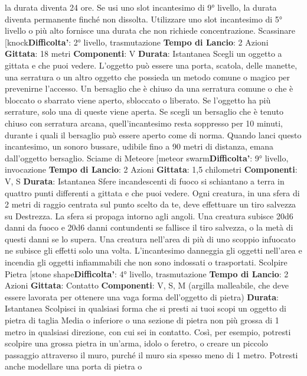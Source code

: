 \begin{multicols}{2}
la durata diventa 24 ore. Se usi uno slot incantesimo di
9° livello, la durata diventa permanente finché non
dissolta. Utilizzare uno slot incantesimo di 5° livello o
più alto fornisce una durata che non richiede
concentrazione.
Scassinare
[knock\textbf{Difficolta'}:
2° livello, trasmutazione
\textbf{Tempo di Lancio}: 2 Azioni
\textbf{Gittata}: 18 metri
\textbf{Componenti}: V
\textbf{Durata}: Istantanea
Scegli un oggetto a gittata e che puoi vedere. L’oggetto
può essere una porta, scatola, delle manette, una
serratura o un altro oggetto che possieda un metodo
comune o magico per prevenirne l’accesso.
Un bersaglio che è chiuso da una serratura comune o
che è bloccato o sbarrato viene aperto, sbloccato o
liberato. Se l’oggetto ha più serrature, solo una di
queste viene aperta.
Se scegli un bersaglio che è tenuto chiuso con
serratura arcana, quell’incantesimo resta soppresso per
10 minuti, durante i quali il bersaglio può essere aperto
come di norma.
Quando lanci questo incantesimo, un sonoro bussare,
udibile fino a 90 metri di distanza, emana dall’oggetto
bersaglio.
Sciame di Meteore
[meteor swarm\textbf{Difficolta'}:
9° livello, invocazione
\textbf{Tempo di Lancio}: 2 Azioni
\textbf{Gittata}: 1,5 chilometri
\textbf{Componenti}: V, S
\textbf{Durata}: Istantanea
Sfere incandescenti di fuoco si schiantano a terra in
quattro punti differenti a gittata e che puoi vedere. Ogni
creatura, in una sfera di 2 metri di raggio centrata sul
punto scelto da te, deve effettuare un tiro salvezza su
Destrezza. La sfera si propaga intorno agli angoli. Una
creatura subisce 20d6 danni da fuoco e 20d6 danni
contundenti se fallisce il tiro salvezza, o la metà di
questi danni se lo supera. Una creatura nell’area di più
di uno scoppio infuocato ne subisce gli effetti solo una
volta.
L’incantesimo danneggia gli oggetti nell’area e incendia
gli oggetti infiammabili che non sono indossati o
trasportati.
Scolpire Pietra
[stone shape\textbf{Difficolta'}:
4° livello, trasmutazione
\textbf{Tempo di Lancio}: 2 Azioni
\textbf{Gittata}: Contatto
\textbf{Componenti}: V, S, M (argilla malleabile, che deve
essere lavorata per ottenere una vaga forma
dell’oggetto di pietra)
\textbf{Durata}: Istantanea
Scolpisci in qualsiasi forma che si presti ai tuoi scopi un
oggetto di pietra di taglia Media o inferiore o una
sezione di pietra non più grossa di 1 metro in qualsiasi
direzione, con cui sei in contatto.
Così, per esempio, potresti scolpire una grossa pietra in
un’arma, idolo o feretro, o creare un piccolo passaggio
attraverso il muro, purché il muro sia spesso meno di
1 metro. Potresti anche modellare una porta di pietra o

\end{multicols}
